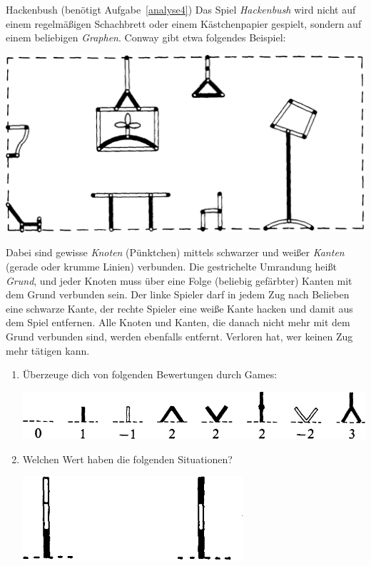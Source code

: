 \documentclass{../zirkelblatt}
\begin{document}
\begin{aufgabe}{Hackenbush (benötigt Aufgabe~\ref{analyse4})}
\label{game-hackenbush}
Das Spiel \emph{Hackenbush} wird nicht auf einem regelmäßigen Schachbrett oder
einem Käst\-chen\-pa\-pier gespielt, sondern auf einem beliebigen \emph{Graphen}.
Conway gibt etwa folgendes Beispiel:
\begin{center}
\includegraphics[scale=0.2]{hackenbush}
\end{center}
Dabei sind gewisse \emph{Knoten} (Pünktchen) mittels schwarzer und weißer
\emph{Kanten} (gerade oder krumme Linien) verbunden. Die gestrichelte Umrandung
heißt \emph{Grund}, und jeder Knoten muss über eine Folge (beliebig gefärbter)
Kanten mit dem Grund verbunden sein. Der linke Spieler darf in
jedem Zug nach Belieben eine schwarze Kante, der rechte Spieler eine weiße
Kante hacken und damit aus dem Spiel entfernen. Alle Knoten und Kanten, die
danach nicht mehr mit dem Grund verbunden sind, werden ebenfalls entfernt.
Verloren hat, wer keinen Zug mehr tätigen kann.
\begin{enumerate}
\item Überzeuge dich von folgenden Bewertungen durch Games:
\begin{center}
\includegraphics[scale=0.4]{hackenbush-beispiele-1}
\end{center}
\item Welchen Wert haben die folgenden Situationen?
\begin{center}
\includegraphics[scale=0.6]{hackenbush-beispiele-2}

\end{center}
\end{enumerate}
\end{aufgabe}
\end{document}
